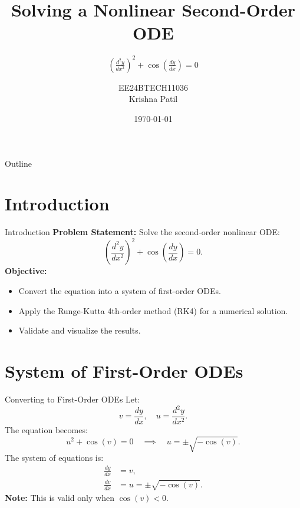 \documentclass[aspectratio=43]{beamer}
\title[\textbf{NCERT 9.1.4}]{Solving a Nonlinear Second-Order ODE}
\subtitle{\((\frac{d^2y}{dx^2})^2 + \cos\left(\frac{dy}{dx}\right) = 0\)}
\author[Krishna Patil]{EE24BTECH11036 \\ Krishna Patil}
\institute[University]{Department of Electrical Engineering}
\date{\today}
\begin{document}
\begin{frame}[plain]
    \titlepage
\end{frame}

\begin{frame}{Outline}
    \tableofcontents
\end{frame}

\section{Introduction}
\begin{frame}{Introduction}
    \textbf{Problem Statement:} Solve the second-order nonlinear ODE:
    \[
    \left(\frac{d^2y}{dx^2}\right)^2 + \cos\left(\frac{dy}{dx}\right) = 0.
    \]
    \pause
    \textbf{Objective:}
    \begin{itemize}
        \item Convert the equation into a system of first-order ODEs.
        \item Apply the Runge-Kutta 4th-order method (RK4) for a numerical solution.
        \item Validate and visualize the results.
    \end{itemize}
\end{frame}

\section{System of First-Order ODEs}
\begin{frame}{Converting to First-Order ODEs}
    Let:
    \[
    v = \frac{dy}{dx}, \quad u = \frac{d^2y}{dx^2}.
    \]
    The equation becomes:
    \[
    u^2 + \cos(v) = 0 \quad \implies \quad u = \pm \sqrt{-\cos(v)}.
    \]
    \pause
    The system of equations is:
    \begin{align*}
        \frac{dy}{dx} &= v, \\
        \frac{dv}{dx} &= u = \pm \sqrt{-\cos(v)}.
    \end{align*}
    \textbf{Note:} This is valid only when \( \cos(v) < 0 \).
\end{frame}

\end{document}
